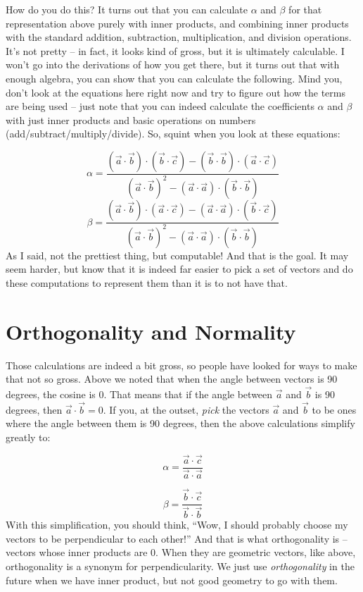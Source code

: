 \documentclass[
]{book}
\begin{document}
How do you do this? It turns out that you can calculate \(\alpha\) and \(\beta\) for that representation above purely with inner products, and combining inner products with the standard addition, subtraction, multiplication, and division operations. It's not pretty -- in fact, it looks kind of gross, but it is ultimately calculable. I won't go into the derivations of how you get there, but it turns out that with enough algebra, you can show that you can calculate the following. Mind you, don't look at the equations here right now and try to figure out how the terms are being used -- just note that you can indeed calculate the coefficients \(\alpha\) and \(\beta\) with just inner products and basic operations on numbers (add/subtract/multiply/divide). So, squint when you look at these equations:

\[\alpha = \frac{(\vec{a}\cdot\vec{b})\cdot(\vec{b}\cdot\vec{c})-(\vec{b}\cdot\vec{b})\cdot(\vec{a}\cdot\vec{c})}{(\vec{a}\cdot\vec{b})^2 - (\vec{a}\cdot\vec{a})\cdot(\vec{b}\cdot\vec{b})}\]
\[\beta = \frac{(\vec{a}\cdot\vec{b})\cdot(\vec{a}\cdot\vec{c})-(\vec{a}\cdot\vec{a})\cdot(\vec{b}\cdot\vec{c})}{(\vec{a}\cdot\vec{b})^2 - (\vec{a}\cdot\vec{a})\cdot(\vec{b}\cdot\vec{b})}\]
As I said, not the prettiest thing, but computable! And that is the goal. It may seem harder, but know that it is indeed far easier to pick a set of vectors and do these computations to represent them than it is to not have that.

\hypertarget{orthogonality-and-normality-1}{%
\section{Orthogonality and Normality}\label{orthogonality-and-normality-1}}

Those calculations are indeed a bit gross, so people have looked for ways to make that not so gross. Above we noted that when the angle between vectors is 90 degrees, the cosine is 0. That means that if the angle between \(\vec{a}\) and \(\vec{b}\) is 90 degrees, then \(\vec{a}\cdot\vec{b} = 0\). If you, at the outset, \emph{pick} the vectors \(\vec{a}\) and \(\vec{b}\) to be ones where the angle between them is 90 degrees, then the above calculations simplify greatly to:

\[\alpha = \frac{\vec{a}\cdot\vec{c}}{\vec{a}\cdot\vec{a}}\]

\[\beta = \frac{\vec{b}\cdot\vec{c}}{\vec{b}\cdot\vec{b}}\]
With this simplification, you should think, ``Wow, I should probably choose my vectors to be perpendicular to each other!'' And that is what orthogonality is -- vectors whose inner products are 0. When they are geometric vectors, like above, orthogonality is a synonym for perpendicularity. We just use \emph{orthogonality} in the future when we have inner product, but not good geometry to go with them.
\end{document}
